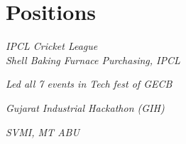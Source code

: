 \documentclass[]{deedy-resume-openfont}
\begin{document}
\begin{minipage}[t]{0.35\textwidth}

\section{Positions}
\footnotesize \textit{IPCL Cricket League}\\

\footnotesize \textit{Shell Baking Furnace Purchasing, IPCL}

\footnotesize \textit{Led all 7 events in Tech fest of GECB}

\footnotesize \textit{Gujarat Industrial Hackathon (GIH)}

\footnotesize \textit{SVMI, MT ABU}\\
\sectionsep

%
%

\end{minipage} 
\hfill
\end{document}
